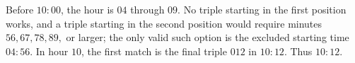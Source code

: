 Before $10{:}00$, the hour is $04$ through $09$. No triple starting in the first position works, and a triple starting in the second position would require minutes $56,67,78,89,$ or larger; the only valid such option is the excluded starting time $04{:}56$. In hour $10$, the first match is the final triple $012$ in $10{:}12$. Thus $\boxed{10{:}12}$.
